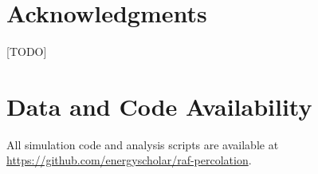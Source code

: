 \documentclass[preprint,12pt]{elsarticle}
\begin{document}
\section*{Acknowledgments}

[TODO]

\section*{Data and Code Availability}

All simulation code and analysis scripts are available at
\url{https://github.com/energyscholar/raf-percolation}.



\end{document}
